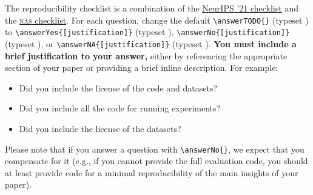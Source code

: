 \documentclass[11pt]{article}
\begin{document}
The reproducibility checklist is a combination of the
%
\href{https://neurips.cc/Conferences/2021/PaperInformation/PaperChecklist}
     {NeurIPS '21 checklist}
%
and the
\href{https://www.automl.org/wp-content/uploads/NAS/NAS_checklist.pdf}
     {\textsc{nas} checklist}.
%
For each question, change the default \verb|\answerTODO{}| (typeset \answerTODO)
to
\verb|\answerYes{[justification]}| (typeset \answerYes),
\verb|\answerNo{[justification]}| (typeset \answerNo), or
\verb|\answerNA{[justification]}| (typeset \answerNA).
\textbf{You must include a brief justification to your answer,} either by
referencing the appropriate section of your paper or providing a brief inline
description.  For example:
\begin{itemize}
\item Did you include the license of the code and datasets? 
\item Did you include all the code for running experiments? 
\item Did you include the license of the datasets? 
\end{itemize}
Please note that if you answer a question with \verb|\answerNo{}|, we expect
that you compensate for it (e.g., if you cannot provide the full evaluation
code, you should at least provide code for a minimal reproducibility of the main
insights of your paper).
\end{document}
